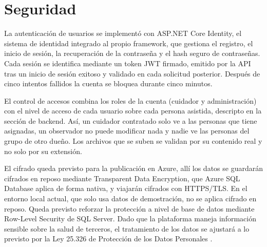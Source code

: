 \section{Seguridad}

La autenticación de usuarios se implementó con ASP.NET Core Identity, el sistema de identidad integrado al propio framework, que gestiona el registro, el inicio de sesión, la recuperación de la contraseña y el hash seguro de contraseñas. Cada sesión se identifica mediante un token JWT firmado, emitido por la API tras un inicio de sesión exitoso y validado en cada solicitud posterior. Después de cinco intentos fallidos la cuenta se bloquea durante cinco minutos.

El control de accesos combina los roles de la cuenta (cuidador y administración) con el nivel de acceso de cada usuario sobre cada persona asistida, descripto en la sección de backend. Así, un cuidador contratado solo ve a las personas que tiene asignadas, un observador no puede modificar nada y nadie ve las personas del grupo de otro dueño. Los archivos que se suben se validan por su contenido real y no solo por su extensión.

El cifrado queda previsto para la publicación en Azure, allí los datos se guardarán cifrados en reposo mediante Transparent Data Encryption, que Azure SQL Database aplica de forma nativa, y viajarán cifrados con HTTPS/TLS. En el entorno local actual, que solo usa datos de demostración, no se aplica cifrado en reposo. Queda previsto reforzar la protección a nivel de base de datos mediante Row-Level Security de SQL Server. Dado que la plataforma maneja información sensible sobre la salud de terceros, el tratamiento de los datos se ajustará a lo previsto por la Ley 25.326 de Protección de los Datos Personales \citep{ley25326}.

